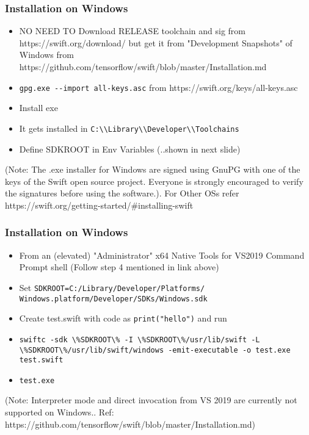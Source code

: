 \begin{frame} \frametitle{Installation on Windows}
\begin{itemize}
\item NO NEED TO Download RELEASE toolchain and sig from https://swift.org/download/ but get it from "Development Snapshots" of Windows from https://github.com/tensorflow/swift/blob/master/Installation.md

\item \lstinline|gpg.exe --import all-keys.asc| from https://swift.org/keys/all-keys.asc
\item Install exe
\item It gets installed in \lstinline|C:\\Library\\Developer\\Toolchains|
\item Define SDKROOT in Env Variables (..shown in next slide)
\end{itemize}

{\tiny (Note:  The .exe installer for Windows are signed using GnuPG with one of the keys of the Swift open source project. Everyone is strongly encouraged to verify the signatures before using the software.). For Other OSs refer https://swift.org/getting-started/\#installing-swift}
\end{frame}

\begin{frame} \frametitle{Installation on Windows}
\begin{itemize}

\item From an (elevated) "Administrator" x64 Native Tools for VS2019 Command Prompt shell (Follow step 4 mentioned in link above)
\item Set \lstinline|SDKROOT=C:/Library/Developer/Platforms/| \lstinline|Windows.platform/Developer/SDKs/Windows.sdk|
\item Create test.swift with code as \lstinline|print("hello")| and run
\item \lstinline|swiftc -sdk \%SDKROOT\% -I \%SDKROOT\%/usr/lib/swift -L \%SDKROOT\%/usr/lib/swift/windows -emit-executable -o test.exe test.swift|
\item \lstinline|test.exe|
\end{itemize}
{\tiny (Note:  Interpreter mode and direct invocation from VS 2019 are currently not supported on Windows.. Ref: https://github.com/tensorflow/swift/blob/master/Installation.md)}
\end{frame}


